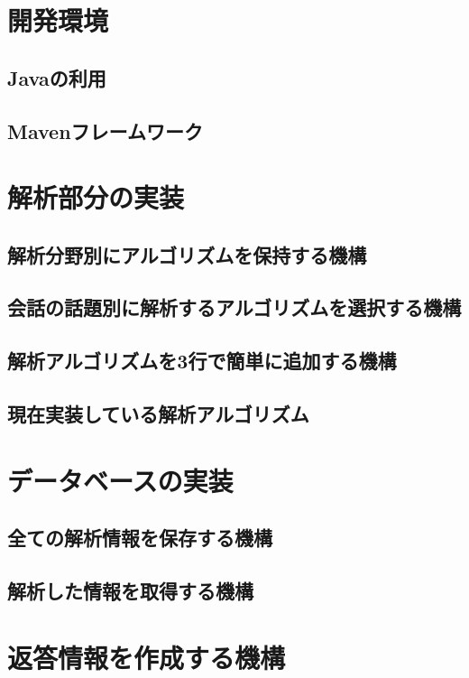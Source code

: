 
\section{開発環境}
\subsection{Javaの利用}
\subsection{Mavenフレームワーク}

\section{解析部分の実装}
\subsection{解析分野別にアルゴリズムを保持する機構}
\subsection{会話の話題別に解析するアルゴリズムを選択する機構}
\subsection{解析アルゴリズムを3行で簡単に追加する機構}
\subsection{現在実装している解析アルゴリズム}


\section{データベースの実装}
\subsection{全ての解析情報を保存する機構}
\subsection{解析した情報を取得する機構}

\section{返答情報を作成する機構}
